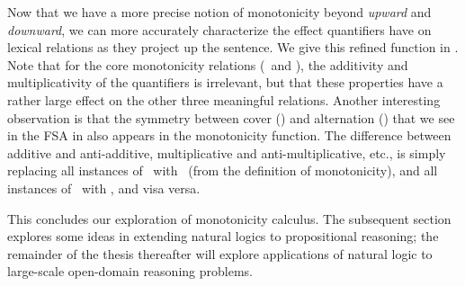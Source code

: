 Now that we have a more precise notion of monotonicity beyond \textit{upward} 
  and \textit{downward}, we can more accurately characterize the effect quantifiers have on
  lexical relations as they project up the sentence.
We give this refined function in .
Note that for the core monotonicity relations (\forward\ and \reverse), the additivity and
  multiplicativity of the quantifiers is irrelevant, but that these properties have a rather
  large effect on the other three meaningful relations.
Another interesting observation is that the symmetry between 
  cover (\cover) and alternation (\alternate) that we see in the FSA in 
  also appears in the monotonicity function.
The difference between additive and anti-additive, multiplicative and anti-multiplicative, etc.,
  is simply replacing all instances of \forward\ with \reverse\ (from the definition of
  monotonicity), and all instances of \cover\ with \alternate, and visa versa.

This concludes our exploration of monotonicity calculus.
The subsequent section explores some ideas in extending natural logics to propositional 
  reasoning; the remainder of the thesis thereafter will explore applications of natural logic
  to large-scale open-domain reasoning problems.




